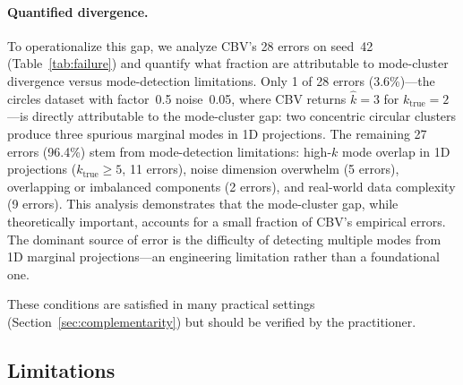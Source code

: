 \documentclass[journal]{IEEEtran}
\begin{document}
\paragraph{Quantified divergence.}
To operationalize this gap, we analyze CBV's 28 errors on seed~42 (Table~\ref{tab:failure}) and quantify what fraction are attributable to mode-cluster divergence versus mode-detection limitations. Only 1 of 28 errors (3.6\%)---the circles dataset with factor~0.5 noise~0.05, where CBV returns $\hat{k} = 3$ for $k_{\mathrm{true}} = 2$---is directly attributable to the mode-cluster gap: two concentric circular clusters produce three spurious marginal modes in 1D projections. The remaining 27 errors (96.4\%) stem from mode-detection limitations: high-$k$ mode overlap in 1D projections ($k_{\mathrm{true}} \geq 5$, 11 errors), noise dimension overwhelm (5 errors), overlapping or imbalanced components (2 errors), and real-world data complexity (9 errors). This analysis demonstrates that the mode-cluster gap, while theoretically important, accounts for a small fraction of CBV's empirical errors. The dominant source of error is the difficulty of detecting multiple modes from 1D marginal projections---an engineering limitation rather than a foundational one.

These conditions are satisfied in many practical settings (Section~\ref{sec:complementarity}) but should be verified by the practitioner.

\subsection{Limitations}
\label{sec:limitations}
\end{document}
